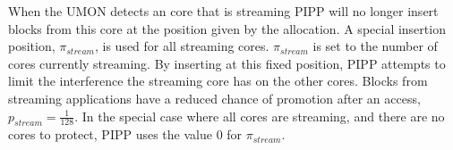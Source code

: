 When the UMON detects an core that is streaming PIPP will no longer insert blocks from this core at the position given by the allocation.
A special insertion position, $\pi_{stream}$, is used for all streaming cores.
$\pi_{stream}$ is set to the number of cores currently streaming. 
By inserting at this fixed position, PIPP attempts to limit the interference the streaming core has on the other cores.
Blocks from streaming applications have a reduced chance of promotion after an access, $p_{stream} = \frac{1}{128}$.
In the special case where all cores are streaming, and there are no cores to protect, PIPP uses the value 0 for $\pi_{stream}$.

